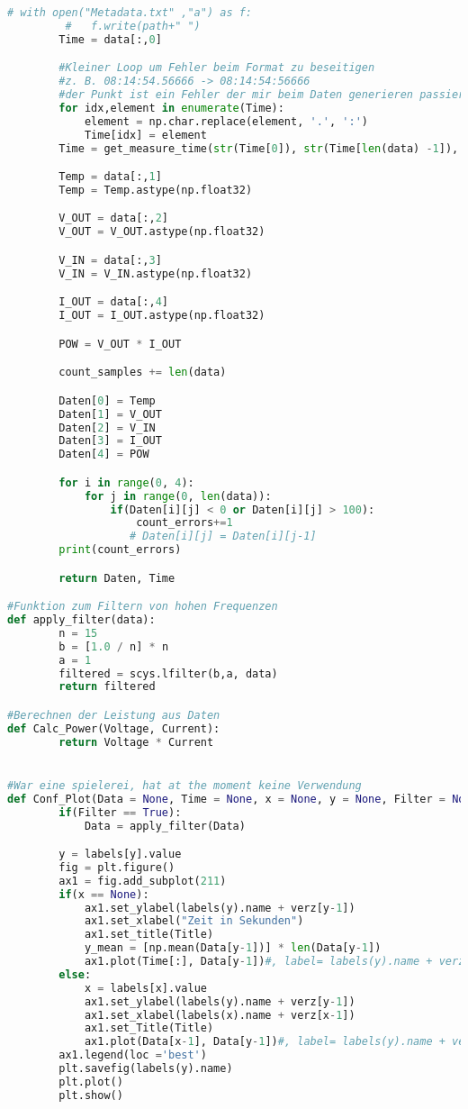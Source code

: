 \begin{lstlisting}[language = Python]
       # with open("Metadata.txt" ,"a") as f:
         #   f.write(path+" ")
        Time = data[:,0]

        #Kleiner Loop um Fehler beim Format zu beseitigen
        #z. B. 08:14:54.56666 -> 08:14:54:56666
        #der Punkt ist ein Fehler der mir beim Daten generieren passiert ist
        for idx,element in enumerate(Time):
            element = np.char.replace(element, '.', ':')
            Time[idx] = element
        Time = get_measure_time(str(Time[0]), str(Time[len(data) -1]), len(data))

        Temp = data[:,1]
        Temp = Temp.astype(np.float32)

        V_OUT = data[:,2]
        V_OUT = V_OUT.astype(np.float32)

        V_IN = data[:,3]
        V_IN = V_IN.astype(np.float32)

        I_OUT = data[:,4]
        I_OUT = I_OUT.astype(np.float32)

        POW = V_OUT * I_OUT

        count_samples += len(data)

        Daten[0] = Temp
        Daten[1] = V_OUT
        Daten[2] = V_IN
        Daten[3] = I_OUT
        Daten[4] = POW

        for i in range(0, 4):
            for j in range(0, len(data)):
                if(Daten[i][j] < 0 or Daten[i][j] > 100):
                    count_errors+=1
                   # Daten[i][j] = Daten[i][j-1]
        print(count_errors)

        return Daten, Time

#Funktion zum Filtern von hohen Frequenzen
def apply_filter(data):
        n = 15
        b = [1.0 / n] * n
        a = 1
        filtered = scys.lfilter(b,a, data)
        return filtered

#Berechnen der Leistung aus Daten
def Calc_Power(Voltage, Current):
        return Voltage * Current


#War eine spielerei, hat at the moment keine Verwendung
def Conf_Plot(Data = None, Time = None, x = None, y = None, Filter = None, Title = None):
        if(Filter == True):
            Data = apply_filter(Data)

        y = labels[y].value
        fig = plt.figure()
        ax1 = fig.add_subplot(211)
        if(x == None):
            ax1.set_ylabel(labels(y).name + verz[y-1])
            ax1.set_xlabel("Zeit in Sekunden")
            ax1.set_title(Title)
            y_mean = [np.mean(Data[y-1])] * len(Data[y-1])
            ax1.plot(Time[:], Data[y-1])#, label= labels(y).name + verz[y] +  vs  + Zeit in Sekunden)
        else:
            x = labels[x].value
            ax1.set_ylabel(labels(y).name + verz[y-1])
            ax1.set_xlabel(labels(x).name + verz[x-1])
            ax1.set_Title(Title)
            ax1.plot(Data[x-1], Data[y-1])#, label= labels(y).name + verz[y-1] +  vs  + labels(x).name + verz[x-1].name)
        ax1.legend(loc ='best')
        plt.savefig(labels(y).name)
        plt.plot()
        plt.show()
        

\end{lstlisting}
